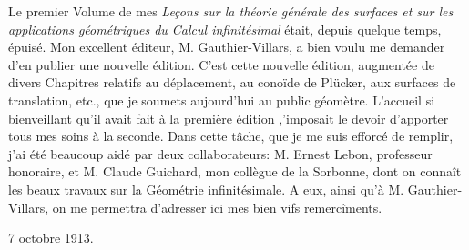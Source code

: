 

Le premier Volume de mes \textit{Leçons sur la théorie générale des surfaces et sur les applications géométriques du 
Calcul infinitésimal} était, depuis quelque temps, épuisé. Mon excellent éditeur, M. Gauthier-Villars, a bien voulu me 
demander d'en publier une nouvelle édition. C'est cette nouvelle édition, augmentée de divers Chapitres relatifs au 
déplacement, au conoïde de Plücker, aux surfaces de translation, etc., que je soumets aujourd'hui au public géomètre. 
L'accueil si bienveillant qu'il avait fait à la première édition ,'imposait le devoir d'apporter tous mes soins à la 
seconde. Dans cette tâche, que je me suis efforcé de remplir, j'ai été beaucoup aidé par deux collaborateurs: M. Ernest 
Lebon, professeur honoraire, et M. Claude Guichard, mon collègue de la Sorbonne, dont on connaît les beaux travaux sur 
la Géométrie infinitésimale. A eux, ainsi qu'à M. Gauthier-Villars, on me permettra d'adresser ici mes bien vifs 
remercîments.

\begin{flushright}
  {\small{7 octobre 1913.}}
\end{flushright}








